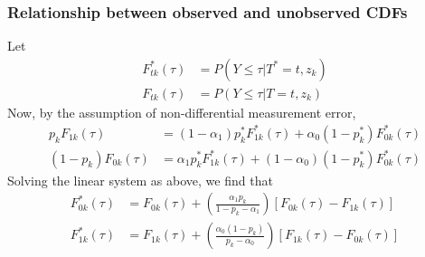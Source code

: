 \documentclass[12pt]{article}
\begin{document}
\subsubsection{Relationship between observed and unobserved CDFs}
Let
\begin{align*}
F^*_{tk}(\tau) &= P(Y \leq \tau|T^*=t, z_k)\\
F_{tk}(\tau) &= P(Y \leq \tau|T=t, z_k)
\end{align*}
Now, by the assumption of non-differential measurement error,
\begin{align*}
  p_k F_{1k}(\tau) &= (1 - \alpha_1) p_k^* F_{1k}^*(\tau) + \alpha_0 (1 - p_k^*)F_{0k}^*(\tau)\\
  (1 - p_k) F_{0k}(\tau) &= \alpha_1 p_k^* F_{1k}^*(\tau) + (1 - \alpha_0) (1 - p_k^*)F_{0k}^*(\tau)
\end{align*}
Solving the linear system as above, we find that
\begin{align*}
  F_{0k}^*(\tau) &= F_{0k}(\tau) + \left( \frac{\alpha_1 p_k}{1 - p_k - \alpha_1} \right)\left[ F_{0k}(\tau) - F_{1k}(\tau) \right]\\
  F_{1k}^*(\tau) &= F_{1k}(\tau) + \left( \frac{\alpha_0 (1-p_k)}{p_k - \alpha_0} \right)\left[ F_{1k}(\tau) - F_{0k}(\tau) \right]\\
\end{align*}
\end{document}
